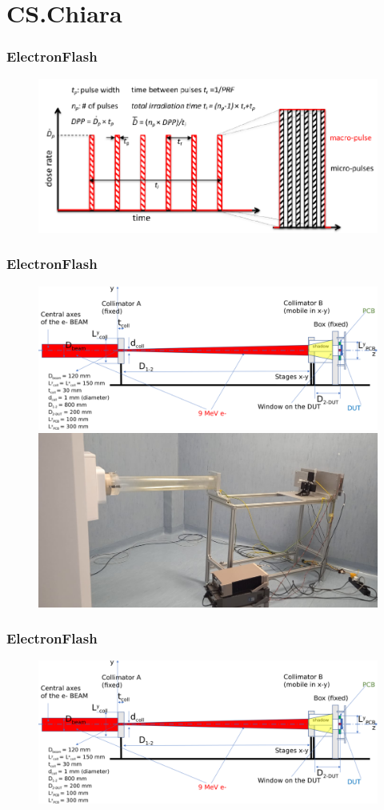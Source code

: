 \section{CS.Chiara}
        
    \begin{frame}
        \frametitle{ElectronFlash}
        \begin{figure}[h!]
            \centering
            \includegraphics[width=.2\linewidth]{figures/test_beam/beam_structure.pdf}
        \end{figure}
    \end{frame}

    \begin{frame}
        \frametitle{ElectronFlash}
        \begin{figure}[h!]
            \centering
            \includegraphics[width=.2\linewidth]{figures/test_beam/Flash-beam-scheme.pdf}\\
            \includegraphics[width=.2\linewidth]{figures/test_beam/carrello.jpeg}       
        \end{figure}
    \end{frame}    

    
    \begin{frame}
        \frametitle{ElectronFlash}
        \begin{figure}[h!]
            \centering
            \includegraphics[width=.2\linewidth]{figures/test_beam/Flash-beam-scheme.pdf}\\     
        \end{figure}
    \end{frame}   
